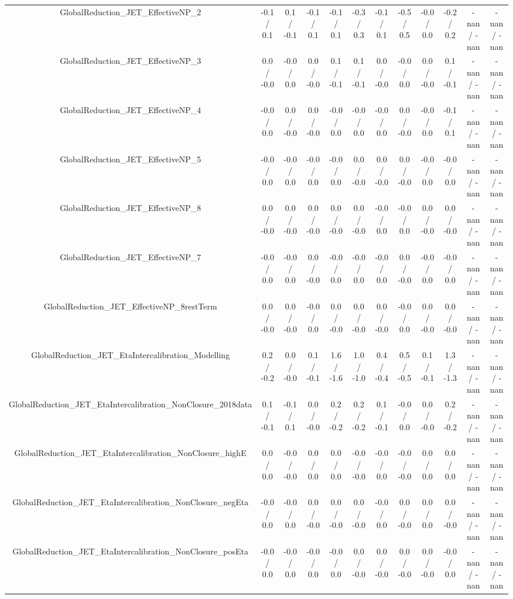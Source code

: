 \begin{table}[htbp]
\begin{center}
\begin{tabular}{|c|c|c|c|c|c|c|c|c|c|c|c|}
  GlobalReduction_JET_EffectiveNP_2 & -0.1 / 0.1 & 0.1 / -0.1 & -0.1 / 0.1 & -0.1 / 0.1 & -0.3 / 0.3 & -0.1 / 0.1 & -0.5 / 0.5 & -0.0 / 0.0 & -0.2 / 0.2 & -nan / -nan & -nan / -nan \\ 
  GlobalReduction_JET_EffectiveNP_3 & 0.0 / -0.0 & -0.0 / 0.0 & 0.0 / -0.0 & 0.1 / -0.1 & 0.1 / -0.1 & 0.0 / -0.0 & -0.0 / 0.0 & 0.0 / -0.0 & 0.1 / -0.1 & -nan / -nan & -nan / -nan \\ 
  GlobalReduction_JET_EffectiveNP_4 & -0.0 / 0.0 & 0.0 / -0.0 & 0.0 / -0.0 & -0.0 / 0.0 & -0.0 / 0.0 & -0.0 / 0.0 & 0.0 / -0.0 & -0.0 / 0.0 & -0.1 / 0.1 & -nan / -nan & -nan / -nan \\ 
  GlobalReduction_JET_EffectiveNP_5 & -0.0 / 0.0 & -0.0 / 0.0 & -0.0 / 0.0 & -0.0 / 0.0 & 0.0 / -0.0 & 0.0 / -0.0 & 0.0 / -0.0 & -0.0 / 0.0 & -0.0 / 0.0 & -nan / -nan & -nan / -nan \\ 
  GlobalReduction_JET_EffectiveNP_8 & 0.0 / -0.0 & 0.0 / -0.0 & 0.0 / -0.0 & 0.0 / -0.0 & 0.0 / -0.0 & -0.0 / 0.0 & -0.0 / 0.0 & 0.0 / -0.0 & 0.0 / -0.0 & -nan / -nan & -nan / -nan \\ 
  GlobalReduction_JET_EffectiveNP_7 & -0.0 / 0.0 & -0.0 / 0.0 & 0.0 / -0.0 & -0.0 / 0.0 & -0.0 / 0.0 & -0.0 / 0.0 & 0.0 / -0.0 & -0.0 / 0.0 & -0.0 / 0.0 & -nan / -nan & -nan / -nan \\ 
  GlobalReduction_JET_EffectiveNP_8restTerm & 0.0 / -0.0 & 0.0 / -0.0 & -0.0 / 0.0 & 0.0 / -0.0 & 0.0 / -0.0 & 0.0 / -0.0 & -0.0 / 0.0 & 0.0 / -0.0 & 0.0 / -0.0 & -nan / -nan & -nan / -nan \\ 
  GlobalReduction_JET_EtaIntercalibration_Modelling & 0.2 / -0.2 & 0.0 / -0.0 & 0.1 / -0.1 & 1.6 / -1.6 & 1.0 / -1.0 & 0.4 / -0.4 & 0.5 / -0.5 & 0.1 / -0.1 & 1.3 / -1.3 & -nan / -nan & -nan / -nan \\ 
  GlobalReduction_JET_EtaIntercalibration_NonClosure_2018data & 0.1 / -0.1 & -0.1 / 0.1 & 0.0 / -0.0 & 0.2 / -0.2 & 0.2 / -0.2 & 0.1 / -0.1 & -0.0 / 0.0 & 0.0 / -0.0 & 0.2 / -0.2 & -nan / -nan & -nan / -nan \\ 
  GlobalReduction_JET_EtaIntercalibration_NonClosure_highE & 0.0 / 0.0 & -0.0 / -0.0 & 0.0 / 0.0 & 0.0 / 0.0 & -0.0 / -0.0 & -0.0 / 0.0 & -0.0 / -0.0 & 0.0 / 0.0 & 0.0 / 0.0 & -nan / -nan & -nan / -nan \\ 
  GlobalReduction_JET_EtaIntercalibration_NonClosure_negEta & -0.0 / 0.0 & -0.0 / 0.0 & 0.0 / -0.0 & 0.0 / -0.0 & 0.0 / -0.0 & -0.0 / 0.0 & 0.0 / -0.0 & 0.0 / 0.0 & 0.0 / -0.0 & -nan / -nan & -nan / -nan \\ 
  GlobalReduction_JET_EtaIntercalibration_NonClosure_posEta & -0.0 / 0.0 & -0.0 / 0.0 & -0.0 / 0.0 & -0.0 / 0.0 & 0.0 / -0.0 & 0.0 / -0.0 & 0.0 / -0.0 & 0.0 / -0.0 & -0.0 / 0.0 & -nan / -nan & -nan / -nan \\ 

\end{tabular}
\end{center}
\end{table}
